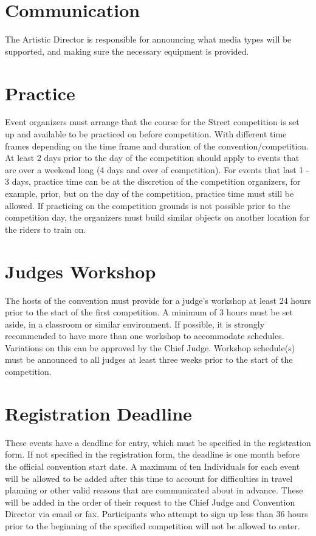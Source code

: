 \section{Communication}

The Artistic Director is responsible for announcing what media types will be supported, and making sure the necessary equipment is provided.

\section{Practice}

Event organizers must arrange that the course for the Street competition is set up and available to be practiced on before competition.
With different time frames depending on the time frame and duration of the convention/competition.
At least 2 days prior to the day of the competition should apply to events that are over a weekend long (4 days and over of competition).
For events that last 1 - 3 days, practice time can be at the discretion of the competition organizers, for example, prior, but on the day of the competition, practice time must still be allowed.
If practicing on the competition grounds is not possible prior to the competition day, the organizers must build similar objects on another location for the riders to train on.

\section{Judges Workshop}
The hosts of the convention must provide for a judge's workshop at least 24 hours prior to the start of the first competition.
A minimum of 3 hours must be set aside, in a classroom or similar environment.
If possible, it is strongly recommended to have more than one workshop to accommodate schedules.
Variations on this can be approved by the Chief Judge.
Workshop schedule(s) must be announced to all judges at least three weeks prior to the start of the competition.

\section{Registration Deadline}

These events have a deadline for entry, which must be specified in the registration form.
If not specified in the registration form, the deadline is one month before the official convention start date.
A maximum of ten Individuals for each event will be allowed to be added after this time to account for difficulties in travel planning or other valid reasons that are communicated about in advance.
These will be added in the order of their request to the Chief Judge and Convention Director via email or fax.
Participants who attempt to sign up less than 36 hours prior to the beginning of the specified competition will not be allowed to enter.

